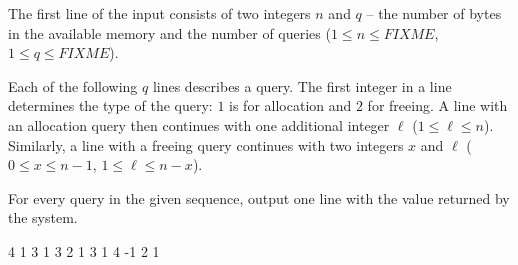 The first line of the input consists of two integers $n$ and $q$ -- the number
of bytes in the available memory and the number of queries ($1 \leq n \leq
FIXME$, $1 \leq q \leq FIXME$).

Each of the following $q$ lines describes a query. The first integer in a line
determines the type of the query: $1$ is for allocation and $2$ for freeing. A
line with an allocation query then continues with one additional integer $\ell$
($1 \leq \ell \leq n$). Similarly, a line with a freeing query continues with
two integers $x$ and $\ell$ ($0 \leq x \leq n-1$, $1 \leq \ell \leq n-x$).



For every query in the given sequence, output one line with the value returned
by the system.



 4
1 3
1 3
2 1 3
1 4
-1
2
1
\sampleEND



